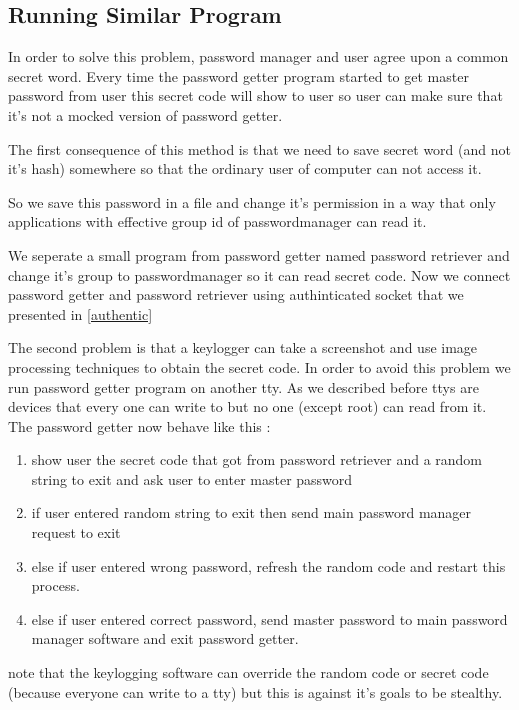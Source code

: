 \documentclass[journal]{IEEEtran}
\begin{document}
\subsection{Running Similar Program}

In order to solve this problem, password manager and user agree upon a common secret word. Every time the password getter program started to get master password from user this secret code 
will show to user so user can make sure that it's not a mocked version of password getter.


The first consequence of this method is that we need to save secret word (and not it's hash) somewhere so that the ordinary user of computer can not access it. 

So we save this password in a file and change it's permission in a way that only applications with effective group id of passwordmanager can read it.

We seperate a small program from password getter named password retriever and change it's group to passwordmanager so it can read secret code. Now we connect password getter and password retriever using authinticated socket that we presented in \ref{authentic}


The second problem is that a keylogger can take a screenshot and use image processing techniques to obtain the secret code. In order to avoid this problem we run password getter program on 
another tty. As we described before ttys are devices that every one can write to but no one (except root) can read from it. The password getter now behave like this :

\begin{enumerate}
\item show user the secret code that got from password retriever and a random string to exit and ask user to enter master password
\item if user entered random string to exit then send main password manager request to exit
\item else if user entered wrong password, refresh the random code and restart this process.
\item else if user entered correct password, send master password to main password manager software and exit password getter.
\end{enumerate}

note that the keylogging software can override the random code or secret code (because everyone can write to a tty) but this is against it's goals to be stealthy.
\end{document}
